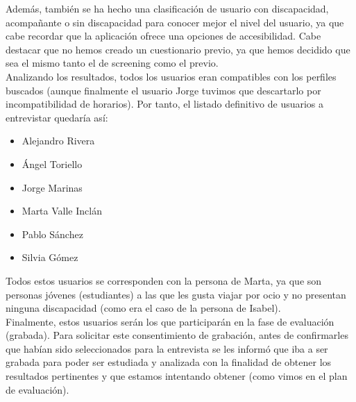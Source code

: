 Además, también se ha hecho una clasificación de usuario con discapacidad, acompañante o sin discapacidad para conocer mejor el nivel del usuario, ya que cabe recordar 
que la aplicación ofrece una opciones de accesibilidad. Cabe destacar que no hemos creado un cuestionario previo, ya que hemos decidido que sea el mismo tanto el de 
screening como el previo. \\ 

Analizando los resultados, todos los usuarios eran compatibles con los perfiles buscados (aunque finalmente el usuario Jorge tuvimos que descartarlo por incompatibilidad
de horarios). Por tanto, el listado definitivo de usuarios a entrevistar quedaría así:
\begin{itemize}
    \item Alejandro Rivera
    \item Ángel Toriello
    \item Jorge Marinas
    \item Marta Valle Inclán
    \item Pablo Sánchez
    \item Silvia Gómez
\end{itemize}

Todos estos usuarios se corresponden con la persona de Marta, ya que son personas jóvenes (estudiantes) a las que les gusta viajar por ocio y no presentan ninguna discapacidad
(como era el caso de la persona de Isabel). \\

Finalmente, estos usuarios serán los que participarán en la fase de evaluación (grabada). Para solicitar este consentimiento de grabación, antes de confirmarles que 
habían sido seleccionados para la entrevista se les informó que iba a ser grabada para poder ser estudiada y analizada con la finalidad de obtener los resultados
pertinentes y que estamos intentando obtener (como vimos en el plan de evaluación).